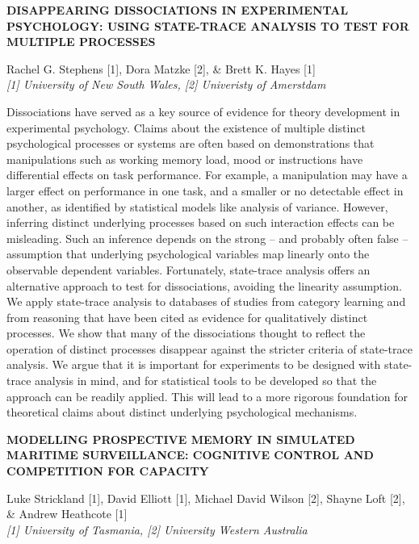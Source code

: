 \documentclass[]{article}
\begin{document}
\textbf{DISAPPEARING DISSOCIATIONS IN EXPERIMENTAL PSYCHOLOGY: USING
STATE-TRACE ANALYSIS TO TEST FOR MULTIPLE PROCESSES}

Rachel G. Stephens {[}1{]}, Dora Matzke {[}2{]}, \& Brett K. Hayes
{[}1{]}\\
\emph{{[}1{]} University of New South Wales, {[}2{]} Univeristy of
Amerstdam}

Dissociations have served as a key source of evidence for theory
development in experimental psychology. Claims about the existence of
multiple distinct psychological processes or systems are often based on
demonstrations that manipulations such as working memory load, mood or
instructions have differential effects on task performance. For example,
a manipulation may have a larger effect on performance in one task, and
a smaller or no detectable effect in another, as identified by
statistical models like analysis of variance. However, inferring
distinct underlying processes based on such interaction effects can be
misleading. Such an inference depends on the strong -- and probably
often false -- assumption that underlying psychological variables map
linearly onto the observable dependent variables. Fortunately,
state-trace analysis offers an alternative approach to test for
dissociations, avoiding the linearity assumption. We apply state-trace
analysis to databases of studies from category learning and from
reasoning that have been cited as evidence for qualitatively distinct
processes. We show that many of the dissociations thought to reflect the
operation of distinct processes disappear against the stricter criteria
of state-trace analysis. We argue that it is important for experiments
to be designed with state-trace analysis in mind, and for statistical
tools to be developed so that the approach can be readily applied. This
will lead to a more rigorous foundation for theoretical claims about
distinct underlying psychological mechanisms.\\
\pagebreak  

\textbf{MODELLING PROSPECTIVE MEMORY IN SIMULATED MARITIME SURVEILLANCE:
COGNITIVE CONTROL AND COMPETITION FOR CAPACITY}

Luke Strickland {[}1{]}, David Elliott {[}1{]}, Michael David Wilson
{[}2{]}, Shayne Loft {[}2{]}, \& Andrew Heathcote {[}1{]}\\
\emph{{[}1{]} University of Tasmania, {[}2{]} University Western
Australia}
\end{document}
